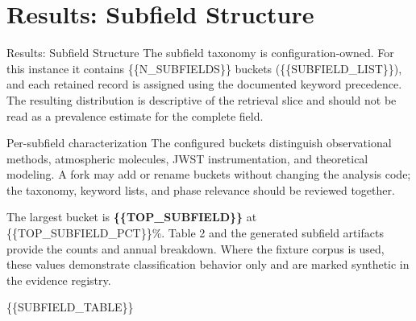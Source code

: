 \documentclass[
  ignorenonframetext,
]{beamer}
\author{}
\date{}
\begin{document}
\section{Results: Subfield Structure}\label{results-subfield-structure}

\begin{frame}[allowframebreaks]{Results: Subfield Structure}
The subfield taxonomy is configuration-owned. For this instance it
contains \{\{N\_SUBFIELDS\}\} buckets (\{\{SUBFIELD\_LIST\}\}), and each
retained record is assigned using the documented keyword precedence. The
resulting distribution is descriptive of the retrieval slice and should
not be read as a prevalence estimate for the complete field.
\end{frame}

\begin{frame}[allowframebreaks]{Per-subfield characterization}
\label{per-subfield-characterization}
The configured buckets distinguish observational methods, atmospheric
molecules, JWST instrumentation, and theoretical modeling. A fork may
add or rename buckets without changing the analysis code; the taxonomy,
keyword lists, and phase relevance should be reviewed together.

The largest bucket is \textbf{\{\{TOP\_SUBFIELD\}\}} at
\{\{TOP\_SUBFIELD\_PCT\}\}\%. Table 2 and the generated subfield
artifacts provide the counts and annual breakdown. Where the fixture
corpus is used, these values demonstrate classification behavior only
and are marked synthetic in the evidence registry.

\{\{SUBFIELD\_TABLE\}\}
\end{frame}
\end{document}
